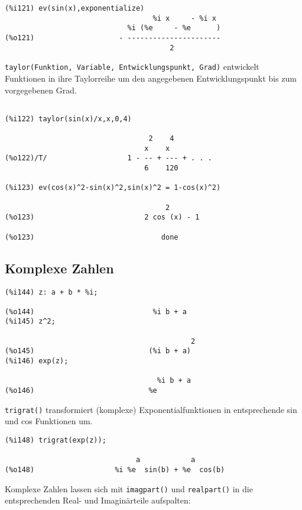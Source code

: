 \documentclass[ngerman,12pt]{scrartcl}
\begin{document}
\begin{verbatim}
(%i121) ev(sin(x),exponentialize)
                                   %i x     - %i x
                             %i (%e     - %e      )
(%o121)                    - ----------------------
                                       2
\end{verbatim}

\texttt{taylor(Funktion, Variable, Entwicklungspunkt, Grad)}
entwickelt Funktionen in ihre Taylorreihe um den angegebenen
Entwicklungspunkt bis zum vorgegebenen Grad.

\begin{verbatim}

(%i122) taylor(sin(x)/x,x,0,4)

                                  2    4
                                 x    x
(%o122)/T/                   1 - -- + --- + . . .
                                 6    120

(%i123) ev(cos(x)^2-sin(x)^2,sin(x)^2 = 1-cos(x)^2)

                                      2
(%o123)                          2 cos (x) - 1

(%o123)                              done
\end{verbatim}

\subsection{Komplexe Zahlen}

\begin{verbatim}
(%i144) z: a + b * %i;

(%o144)                            %i b + a
(%i145) z^2;

                                            2
(%o145)                           (%i b + a)
(%i146) exp(z);

                                    %i b + a
(%o146)                           %e
\end{verbatim}

\texttt{trigrat()} transformiert (komplexe) Exponentialfunktionen in
entsprechende sin und cos Funktionen um.

\begin{verbatim}
(%i148) trigrat(exp(z));

                               a            a
(%o148)                   %i %e  sin(b) + %e  cos(b)
\end{verbatim}

Komplexe Zahlen lassen sich mit \texttt{imagpart()} und
\texttt{realpart()} in die entsprechenden Real- und Imaginärteile
aufspalten:
\end{document}
